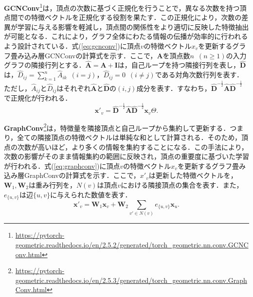 \textbf{GCNConv}\footnote{\url{https://pytorch-geometric.readthedocs.io/en/2.5.2/generated/torch_geometric.nn.conv.GCNConv.html}}\cite{pyg-gcnconv}は，頂点の次数に基づく正規化を行うことで，異なる次数を持つ頂点間での特徴ベクトルを正規化する役割を果たす．この正規化により，次数の差異が学習に与える影響を軽減し，頂点間の関係性をより適切に反映した特徴抽出が可能となる．これにより，グラフ全体にわたる情報の伝播が効率的に行われるよう設計されている．式(\ref{eq:gcnconv})に頂点$v$の特徴ベクトル$x_v$を更新するグラフ畳み込み層GCNConvの計算式を示す．ここで，$\textbf{A}$を頂点数$n$~$(n\geq 1)$の入力グラフの隣接行列とする．$\hat{\textbf{A}}=\textbf{A}+\textbf{I}$は，自己ループを持つ隣接行列を表し，$\hat{\textbf{D}}$は，$\hat{D}_{ij}=\sum_{k=1}^{n}\hat{A}_{ik}$~$(i=j)$，$\hat{D}_{ij}=0$~$(i\not=j)$である対角次数行列を表す．ただし，$\hat{A}_{ij}$と$\hat{D}_{ij}$はそれぞれ$\hat{\textbf{A}}$と$\hat{\textbf{D}}$の$(i,j)$成分を表す．すなわち，$\hat{\textbf{D}}^{-\frac{1}{2}}\hat{\textbf{A}}\hat{\textbf{D}}^{-\frac{1}{2}}$で正規化が行われる．
\begin{equation}
  \label{eq:gcnconv}
  \bm{x}'_{v} = \hat{\textbf{D}}^{-\frac{1}{2}}\hat{\textbf{A}}\hat{\textbf{D}}^{-\frac{1}{2}}\bm{x}_{v}\Theta.
\end{equation}

\textbf{GraphConv}\footnote{\url{https://pytorch-geometric.readthedocs.io/en/2.5.3/generated/torch_geometric.nn.conv.GraphConv.html}}\cite{pyg-graphconv}は，特徴量を隣接頂点と自己ループから集約して更新する．つまり，全ての隣接頂点の特徴ベクトルは単純な和として計算される．そのため，頂点の次数が高いほど，より多くの情報を集約することになる．この手法により，次数の影響がそのまま情報集約の範囲に反映され，頂点の重要度に基づいた学習が行われる．式(\ref{eq:graphconv})に頂点$v$の特徴ベクトル$x_v$を更新するグラフ畳み込み層GraphConvの計算式を示す．ここで，$x'_v$は更新した特徴ベクトルを，$\textbf{W}_1,\textbf{W}_2$は重み行列を，$N(v)$は頂点$v$における隣接頂点の集合を表す．また，$e_{\{u,v\}}$は辺$\{u,v\}$に与えられた数値を表す．
\begin{equation}
  \label{eq:graphconv}
  \bm{x}'_{v}=\textbf{W}_{1}\bm{x}_{v}+\textbf{W}_{2}\sum_{v'\in N(v)}e_{\{u,v\}}\bm{x}_{u}.
\end{equation}

